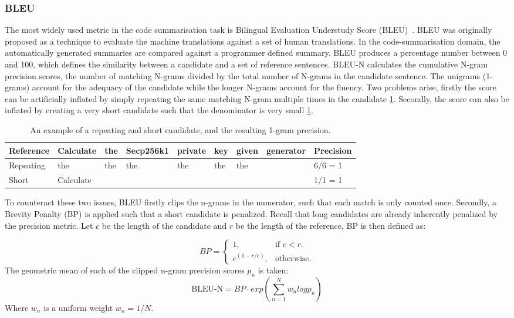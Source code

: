 \subsubsection{BLEU}
The most widely used metric in the code summarisation task is Bilingual Evaluation Understudy Score (BLEU)~\cite{evaluationSummarization}. BLEU was originally proposed as a technique to evaluate the machine translations against a set of human translations. In the code-summarisation domain, the automatically generated summaries are compared against a programmer defined summary. 
BLEU produces a percentage number between 0 and 100, which defines the similarity between a candidate and a set of reference sentences. BLEU-N calculates the cumulative N-gram precision scores, the number of matching N-grams divided by the total number of N-grams in the candidate sentence. The unigrams (1-grams) account for the adequacy of the candidate while the longer N-grams account for the fluency. 
Two problems arise, firstly the score can be artificially inflated by simply repeating the same matching N-gram multiple times in the candidate \ref{tab:BLEUIssues}. Secondly, the score can also be inflated by creating a very short candidate such that the denominator is very small \ref{tab:BLEUIssues}.

\begin{table}[H]
\begin{tabular}{l|lllllll|l}
\rowcolor[HTML]{C0C0C0} 
Reference & Calculate & the & Secp256k1 & private & key & given & generator & Precision \\ \hline
Repeating & the       & the & the       & the     & the & the   &           & 6/6 = 1   \\
Short     & Calculate &     &           &         &     &       &           & 1/1 = 1  
\end{tabular}
\caption{An example of a repeating and short candidate, and the resulting 1-gram precision.}
\label{tab:BLEUIssues}
\end{table}

To counteract these two issues, BLEU firstly clips the n-grams in the numerator, such that each match is only counted once. Secondly, a Brevity Penalty (BP) is applied such that a short candidate is penalized. Recall that long candidates are already inherently penalized by the precision metric. Let \(c\) be the length of the candidate and \(r\) be the length of the reference, BP is then defined as:

\begin{equation}
  BP=\begin{cases}
    1, & \text{if $c<r$}.\\
    e^{(1 - r/c)}, & \text{otherwise}.
  \end{cases}
\end{equation}
The geometric mean of each of the clipped n-gram precision scores \(p_n\) is taken:
\[ \text{BLEU-N} = BP \cdot exp(\sum_{n=1}^{N} w_n log p_n ) \]
Where \(w_n\) is a uniform weight \(w_n = 1/N\).

